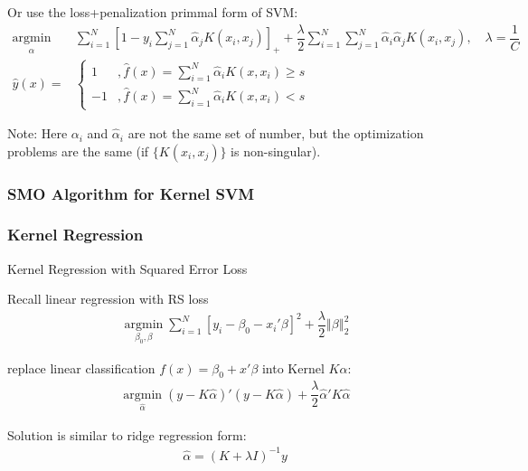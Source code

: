     Or use the loss+penalization primmal form of SVM:
    \begin{align}
        \mathop{\arg\min}\limits_{\hat{\alpha } }&\sum_{i=1}^N\left[ 1-y_i\sum_{j=1}^N\hat{\alpha }_jK(x_i,x_j) \right]_++\dfrac{\lambda }{2}\sum_{i=1}^N\sum_{j=1}^N\hat{\alpha }_i\hat{\alpha }_jK(x_i,x_j),\quad \lambda =\dfrac{1}{C} \\
        \hat{y}(x)=&\begin{cases}
            1 &,\hat{f}(x)=\sum_{i=1}^N\hat{\alpha }_iK(x,x_i)\geq s\\
            -1&,\hat{f}(x)=\sum_{i=1}^N\hat{\alpha }_iK(x,x_i)<s
        \end{cases}
    \end{align}
    
    Note: Here $ \alpha _i $ and $ \hat{\alpha }_i $ are not the same set of number, but the optimization problems are the same (if $ \{K(x_i,x_j)\} $ is non-singular). 

\subsubsection{SMO Algorithm for Kernel SVM}
    
    
\subsubsection{Kernel Regression}\label{SubSubSectionKernelRegression}
\begin{point}
    Kernel Regression with Squared Error Loss
\end{point}

     Recall linear regression with RS loss
     \begin{align}
        \mathop{\arg\min}\limits_{\beta_0,\beta  }\sum_{i=1}^N\left[ y_i-\beta _0-x_i'\beta  \right]^2+\dfrac{\lambda }{2}\left\Vert \beta \right\Vert^2_2
     \end{align}

     replace linear classification $ f(x)=\beta _0+x'\beta  $ into Kernel $ K\alpha  $:
     \begin{align}
        \mathop{\arg\min}\limits_{\hat{\alpha }}(y-K\hat{\alpha } )'(y-K\hat{\alpha } ) +\dfrac{\lambda }{2}\hat{\alpha } 'K\hat{\alpha } 
     \end{align}

     Solution is similar to ridge regression form:
     \begin{align}
        \hat{\alpha }=(K+\lambda I)^{-1}y 
     \end{align}     

